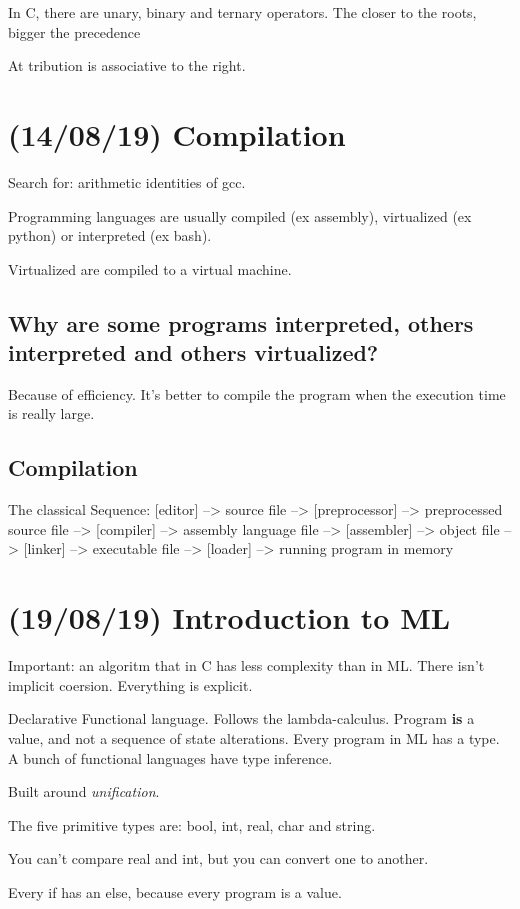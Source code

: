 \documentclass[11pt]{article}
\begin{document}
In C, there are unary, binary and ternary operators. The closer to the roots, bigger the precedence

At  tribution is associative to the right.
\section{(14/08/19) Compilation}
\label{sec:orgb60670e}
Search for: arithmetic identities of gcc.

Programming languages are usually compiled (ex assembly), virtualized (ex python) or
interpreted (ex bash).

Virtualized are compiled to a virtual machine.

\subsection{Why are some programs interpreted, others interpreted and others virtualized?}
\label{sec:org0a1eeaf}
Because of efficiency. It's better to compile the program when the execution time is
really large.
\subsection{Compilation}
\label{sec:org7977643}
The classical Sequence:
[editor] --> source file --> [preprocessor] --> preprocessed source file
--> [compiler] --> assembly language file --> [assembler] -->
object file --> [linker] --> executable file -->
[loader] --> running program in memory

\section{(19/08/19) Introduction to ML}
\label{sec:org1e95fd5}
Important: an algoritm that in C has less complexity than in ML.
There isn't implicit coersion. Everything is explicit.

Declarative Functional language. Follows the lambda-calculus. Program \textbf{is} a value, and
not a sequence of state alterations. Every program in ML has a type. A bunch of
functional languages have type inference.

Built around \emph{unification}.

The five primitive types are: bool, int, real, char and string.

You can't compare real and int, but you can convert one to another.

Every if has an else, because every program is a value.
\end{document}
